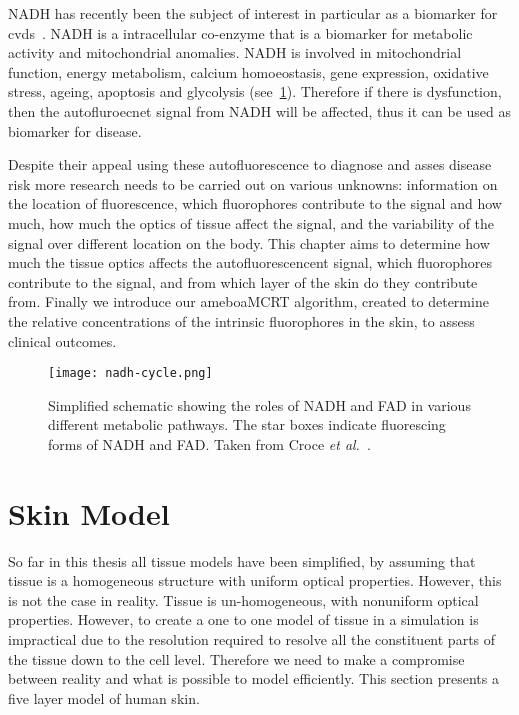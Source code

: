 NADH has recently been the subject of interest in particular as a biomarker for \gls*{cvds}~\cite{akbar2014vivo,elahi2009oxidative,blacker2016investigating}.
NADH is a intracellular co-enzyme that is a biomarker for metabolic activity and mitochondrial anomalies. 
NADH is involved in mitochondrial function, energy metabolism, calcium homoeostasis, gene expression, oxidative stress, ageing, apoptosis and glycolysis (see~\cref{fig:nadhfadpath}).
Therefore if there is dysfunction, then the autofluroecnet signal from NADH will be affected, thus it can be used as biomarker for disease.


Despite their appeal using these autofluorescence to diagnose and asses disease risk more research needs to be carried out on various unknowns: information on the location of fluorescence, which fluorophores contribute to the signal and how much, how much the optics of tissue affect the signal, and the variability of the signal over different location on the body.
This chapter aims to determine how much the tissue optics affects the autofluorescencent signal, which fluorophores contribute to the signal, and from which layer of the skin do they contribute from.
Finally we introduce our ameboaMCRT algorithm, created to determine the relative concentrations of the intrinsic fluorophores in the skin, to assess clinical outcomes.


\begin{figure}[!htpb]
  \centering
  \texttt{[image: nadh-cycle.png]}
  \caption{Simplified schematic showing the roles of NADH and FAD in various different metabolic pathways. The star boxes indicate fluorescing forms of NADH and FAD. Taken from Croce \textit{et al.}~\cite{croce2014autofluorescence}.}
  \label{fig:nadhfadpath}
\end{figure}


\FloatBarrier

\section{Skin Model}

So far in this thesis all tissue models have been simplified, by assuming that tissue is a homogeneous structure with uniform optical properties.
However, this is not the case in reality.
Tissue is un-homogeneous, with nonuniform optical properties.
However, to create a one to one model of tissue in a simulation is impractical due to the resolution required to resolve all the constituent parts of the tissue down to the cell level.
Therefore we need to make a compromise between reality and what is possible to model efficiently.
This section presents a five layer model of human skin. 

